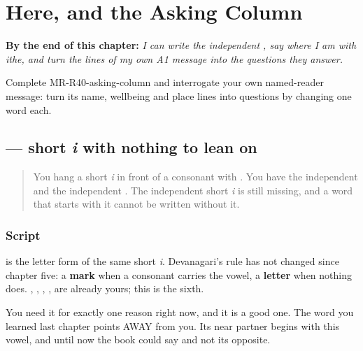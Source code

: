 
\chapter{Here, and the Asking Column}
\label{ch:mr-here}

\begin{chapteropening}
\textbf{By the end of this chapter:} \emph{I can write the independent , say where I am with ithe, and turn the lines of my own A1 message into the questions they answer.}

Complete MR-R40-asking-column and interrogate your own named-reader message: turn its name, wellbeing and place lines into questions by changing one word each.
\end{chapteropening}

\section[\texorpdfstring{\mr{इ} (i)}{इ (i)}]{ — short \emph{i} with nothing to lean on}

\label{lesson:MR-W40-i-independent}



\begin{quote}
You hang a short \emph{i} in front of a consonant with \textbf{}. You have the independent \textbf{} and the independent \textbf{}. The independent short \emph{i} is still missing, and a word that starts with it cannot be written without it.
\end{quote}

\subsection*{Script}
\begin{quote}
\end{quote}

\textbf{} is the letter form of the same short \emph{i}. Devanagari's rule has not changed since chapter five: a \textbf{mark} when a consonant carries the vowel, a \textbf{letter} when nothing does. \textbf{}, \textbf{}, \textbf{}, \textbf{}, \textbf{} are already yours; this is the sixth.

You need it for exactly one reason right now, and it is a good one. The word you learned last chapter points AWAY from you. Its near partner begins with this vowel, and until now the book could say \textbf{} and not its opposite.

